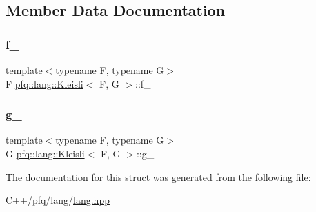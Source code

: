 \subsection{Member Data Documentation}
\mbox{\label{structpfq_1_1lang_1_1Kleisli_a904b72f295e1a832136714faca8a5119}} 
\subsubsection{\texorpdfstring{f\+\_\+}{f\_}}
{\footnotesize\ttfamily template$<$typename F, typename G$>$ \\
F \hyperlink{structpfq_1_1lang_1_1Kleisli}{pfq\+::lang\+::\+Kleisli}$<$ F, G $>$\+::f\+\_\+}

\mbox{\label{structpfq_1_1lang_1_1Kleisli_a29fe52c910805bb5d9582e1ee9a8b2ab}} 
\subsubsection{\texorpdfstring{g\+\_\+}{g\_}}
{\footnotesize\ttfamily template$<$typename F, typename G$>$ \\
G \hyperlink{structpfq_1_1lang_1_1Kleisli}{pfq\+::lang\+::\+Kleisli}$<$ F, G $>$\+::g\+\_\+}



The documentation for this struct was generated from the following file\+:\begin{DoxyCompactItemize}
\item 
C++/pfq/lang/\hyperlink{lang_8hpp}{lang.\+hpp}\end{DoxyCompactItemize}
